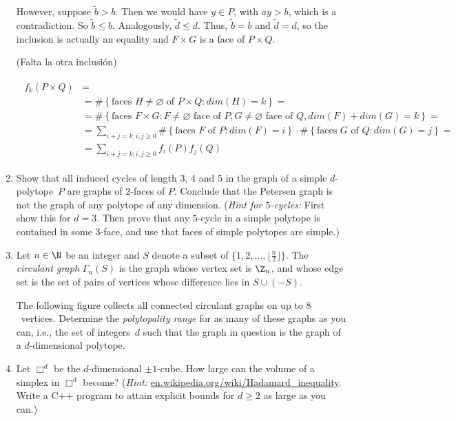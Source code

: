 \begin{enumerate}
However, suppose $\tilde b > b$. Then we would have $y\in P$, with $ay > b$, which is a contradiction. So $\tilde b \leq b$. Analogously, $\tilde d \leq d$. Thus, $\tilde b = b$ and $\tilde d = d$, so the inclusion is actually an equality and $F\times G$ is a face of $P\times Q$.

(Falta la otra inclusión)

\[
\begin{align}
\begin{split}
  f_k(P\times Q)&=\\
  &=\#\left\{\text{faces } H\neq\varnothing \text{ of }P\times Q: dim(H)=k\right\}=\\
  &=\#\left\{\text{faces } F\times G:F\neq\varnothing \text{ face of }P, G\neq\varnothing \text{ face of }Q, dim(F)+dim(G)=k\right\}=\\
  &=\sum_{i+j=k; i,j\geq 0} \#\left\{\text{faces } F \text{ of } P : dim(F)=i\right\}
  \cdot\#\left\{\text{faces } G \text{ of } Q : dim(G)=j\right\}=\\  
  &=\sum_{i+j=k; i,j\geq 0} f_i(P)f_j(Q)
\end{split}
\end{align}
\]

\item Show that all induced cycles of length $3$, $4$ and $5$ in the graph of a simple $d$-polytope~$P$ are graphs of $2$-faces of $P$.
Conclude that the Petersen graph is not the graph of any polytope of any dimension. (\emph{Hint for $5$-cycles:} First show this for $d=3$. Then prove
that any $5$-cycle in a simple polytope is contained in some $3$-face,
and use that faces of  simple polytopes are simple.)

\item Let $n\in\N$ be an integer and $S$ denote a subset of
  $\{1,2,\dots,\lfloor\frac{n}{2}\rfloor\}$.  
  The \emph{circulant graph} $\Gamma_n(S)$ is the graph whose vertex set is $\Z_n$, and whose edge set is the set of pairs of vertices whose difference lies in $S\cup (-S)$. 

The following figure collects all connected circulant graphs on up to $8$~vertices. Determine the \emph{polytopality range} for as many of these graphs as you can, i.e., the set of integers~$d$ such that the graph in question is the graph of a $d$-dimensional polytope.


\item Let $\Box^d$ be the $d$-dimensional $\pm1$-cube. How large can the volume of a simplex in $\Box^d$ become? (\emph{Hint:} \url{en.wikipedia.org/wiki/Hadamard_inequality}. Write a  C++ program to attain explicit bounds for $d\ge2$ as large as you can.)
\end{enumerate}







